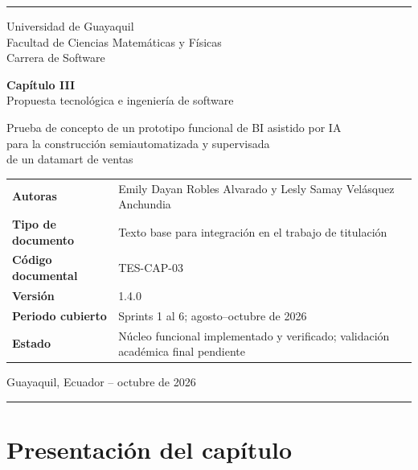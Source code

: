 \documentclass[11pt,letterpaper]{article}
\begin{document}
\hypersetup{pageanchor=false}

\begin{titlepage}
  \thispagestyle{empty}
  \vspace*{0.7cm}
  {\color{ugblue}\rule{\textwidth}{2.8pt}}
  \vspace{1.1cm}

  {\Large Universidad de Guayaquil\\[0.25em]
  Facultad de Ciencias Matemáticas y Físicas\\
  Carrera de Software}

  \vfill

  {\color{deepgreen}\fontsize{27}{33}\selectfont\textbf{Capítulo III}}\\[0.55em]
  {\LARGE Propuesta tecnológica e ingeniería de software}\\[0.75em]
  {\large Prueba de concepto de un prototipo funcional de BI asistido por IA\\
  para la construcción semiautomatizada y supervisada\\
  de un datamart de ventas\par}

  \vspace{1.3cm}

  \begin{tabularx}{\textwidth}{@{}>{\bfseries}l X@{}}
    Autoras & Emily Dayan Robles Alvarado y Lesly Samay Velásquez Anchundia \\
    Tipo de documento & Texto base para integración en el trabajo de titulación \\
    Código documental & TES-CAP-03 \\
    Versión & 1.4.0 \\
    Periodo cubierto & Sprints 1 al 6; agosto--octubre de 2026 \\
    Estado & Núcleo funcional implementado y verificado; validación académica final pendiente \\
  \end{tabularx}

  \vfill
  {\large Guayaquil, Ecuador -- octubre de 2026\par}
  \vspace{0.65cm}
  {\color{ugblue}\rule{\textwidth}{2.8pt}}
\end{titlepage}

\hypersetup{pageanchor=true}
\tableofcontents
\newpage
\listoftables
\listoffigures
\newpage
{}

\section{Presentación del capítulo}
\end{document}
